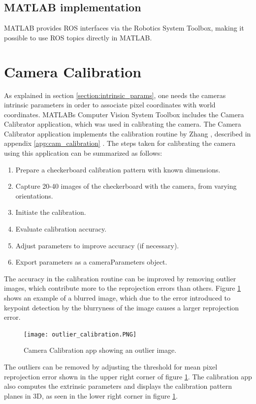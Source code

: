 \subsection{MATLAB implementation}
MATLAB provides ROS interfaces via the Robotics System Toolbox, making it possible to use ROS topics directly in MATLAB. 
\section{Camera Calibration}
As explained in section \ref{section:intrinsic_params}, one needs the cameras intrinsic parameters in order to associate pixel coordinates with world coordinates. MATLABs Computer Vision System Toolbox includes the Camera Calibrator application, which was used in calibrating the camera. The Camera Calibrator application implements the calibration routine by Zhang \cite{flexCal}, described in appendix \ref{app:cam_calibration} \cite{camera_calibrator}. The steps taken for calibrating the camera using this application can be summarized as follows:
\begin{enumerate}
	\item Prepare a checkerboard calibration pattern with known dimensions.
	\item Capture 20-40 images of the checkerboard with the camera, from varying orientations.
	\item Initiate the calibration.
	\item Evaluate calibration accuracy.
	\item Adjust parameters to improve accuracy (if necessary).
	\item Export parameters as a cameraParameters object.
\end{enumerate}
The accuracy in the calibration routine can be improved by removing outlier images, which contribute more to the reprojection errors than others. Figure \ref{fig:calib_outlier} shows an example of a blurred image, which due to the error introduced to keypoint detection by the blurryness of the image causes a larger reprojection error.
\begin{figure}[H]
	\centering
	\texttt{[image: outlier\_calibration.PNG]}
	\caption{Camera Calibration app showing an outlier image.}
	\label{fig:calib_outlier}
\end{figure}
The outliers can be removed by adjusting the threshold for mean pixel reprojection error shown in the upper right corner of figure \ref{fig:calib_outlier}. The calibration app also computes the extrinsic parameters and displays the calibration pattern planes in 3D, as seen in the lower right corner in figure \ref{fig:calib_outlier}.
